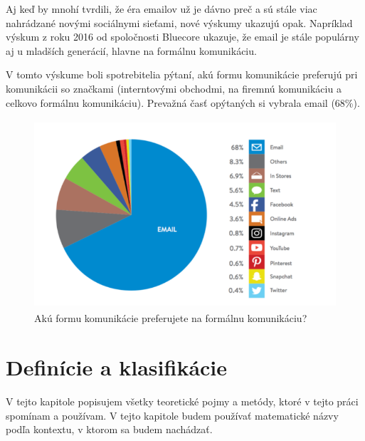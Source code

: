 \documentclass[slovak,master,public,dept460,male,cpdeclaration,oneside]{diploma}
\begin{document}
Aj keď by mnohí tvrdili, že éra emailov už je dávno preč a sú stále viac nahrádzané novými sociálnymi sieťami, nové výskumy ukazujú opak. Napríklad výskum z roku 2016 od spoločnosti Bluecore \cite{13} ukazuje, že email je stále populárny aj u mladších generácií, hlavne na formálnu komunikáciu.

V tomto výskume boli spotrebitelia pýtaní, akú formu komunikácie preferujú pri komunikácii so značkami (interntovými obchodmi, na firemnú komunikáciu a celkovo formálnu komunikáciu). Prevažná časť opýtaných si vybrala email (68\%).

\begin{figure}[H]
\centering
\includegraphics[width=12cm, height=7cm]{figures/emailusage}
\caption{Akú formu komunikácie preferujete na formálnu komunikáciu?}
\end{figure}


\section{Definície a klasifikácie}
V tejto kapitole popisujem všetky teoretické pojmy a metódy, ktoré v tejto práci spomínam a používam. V tejto kapitole budem používať matematické názvy podľa kontextu, v ktorom sa budem nachádzať.
\end{document}
